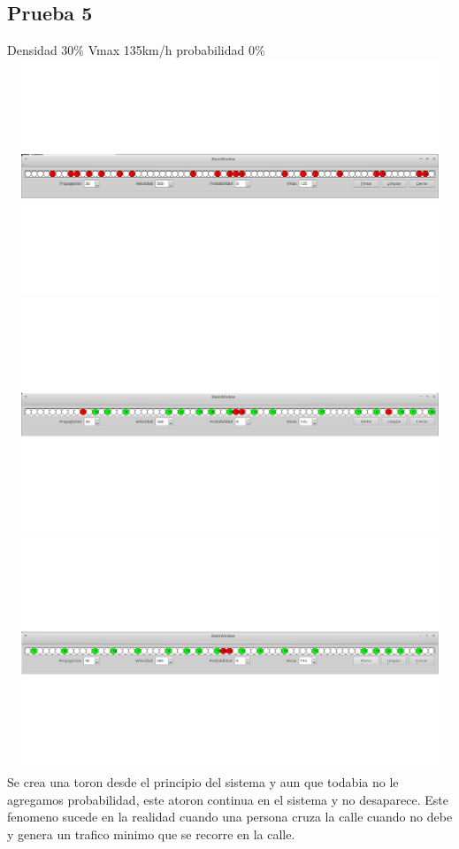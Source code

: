 \documentclass[a4paper,10pt]{article}
\begin{document}
\subsection{Prueba 5}
Densidad 30\% Vmax 135km/h probabilidad 0\%
\\
\includegraphics[width=15cm, height=7cm]{18}
\\
\includegraphics[width=15cm, height=7cm]{19}
\\
\includegraphics[width=15cm, height=7cm]{20}
\\
Se crea una toron desde el principio del sistema y aun que todabia no le agregamos probabilidad, este atoron continua en el sistema y no desaparece. Este fenomeno sucede en la realidad cuando una persona cruza la calle cuando no debe y genera un trafico minimo que se recorre en la calle.
\end{document}
